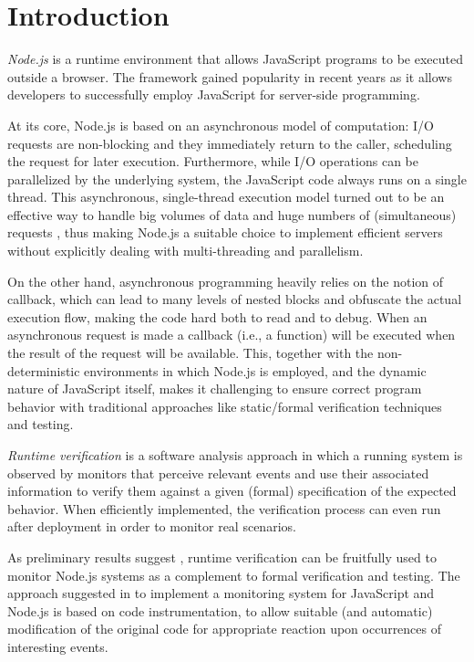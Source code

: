 \section{Introduction}
\emph{Node.js} is a runtime environment that allows JavaScript programs to be executed outside a browser.
The framework gained popularity in recent years as it allows developers to successfully employ JavaScript for server-side programming.

At its core, Node.js is based on an asynchronous model of computation: I/O requests are non-blocking and they immediately return to the caller, scheduling the request for later execution.
Furthermore, while I/O operations can be parallelized by the underlying system, the JavaScript code always runs on a single thread.
This asynchronous, single-thread execution model turned out to be an effective way to handle big volumes of data and huge numbers of (simultaneous) requests \cite{Nodejs10,NodejsPerformance14}, thus making Node.js a suitable choice to implement efficient servers without explicitly dealing with multi-threading and parallelism.


%

On the other hand, asynchronous programming heavily relies on the notion of callback, which can lead to many levels of nested blocks and obfuscate the actual execution flow, making the code hard both to read and to debug.
When an asynchronous request is made a callback (i.e., a function) will be executed when the result of the request will be available.
This, together with the non-deterministic environments in which Node.js is employed, and the dynamic nature of JavaScript itself, makes it challenging to ensure correct program behavior with traditional approaches like static/formal verification techniques and testing.

\emph{Runtime verification} \cite{rv} is a software analysis approach in which a running system is observed by monitors that perceive relevant events and use their associated information to verify them against a given (formal) specification of the expected behavior.
When efficiently implemented, the verification process can even run after deployment in order to monitor real scenarios.

As preliminary results suggest \cite{TowardsIoT17}, runtime verification can be fruitfully used to monitor Node.js systems as a complement to formal verification and testing.
The approach suggested in \cite{TowardsIoT17} to implement a monitoring system for JavaScript and Node.js is based on code instrumentation, to allow suitable (and automatic) modification of the original code for appropriate reaction upon occurrences of interesting events.

